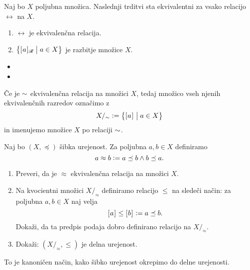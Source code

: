 		
		\begin{izrek}
			Naj bo $X$ poljubna množica. Naslednji trditvi sta ekvivalentni za vsako relacijo $\rel$ na $X$.
			\begin{enumerate}
				\item
					$\rel$ je ekvivalenčna relacija.
				\item
					$\set[1]{\ec[\rel]{a}}{a \in X}$ je razbitje množice $X$.
			\end{enumerate}
		\end{izrek}
		
		\begin{dokaz}
			\begin{itemize}
				\item{}
				\item{}
			\end{itemize}
		\end{dokaz}
		
		Če je $\sim$ ekvivalenčna relacija na množici $X$, tedaj množico vseh njenih ekvivalenčnih razredov označimo z
		\[X/_\equ \dfeq \set[1]{\ec{a}}{a \in X}\]
		in imenujemo  množice $X$ po relaciji $\sim$.
		
		
		\begin{vaja}
			Naj bo $(X, \preceq)$ šibka urejenost. Za poljubna $a, b \in X$ definiramo
			\[a \approx b \mathrel{\mathop:}= a \preceq b \land b \preceq a.\]
			\begin{enumerate}
				\item
					Preveri, da je $\approx$ ekvivalenčna relacija na množici $X$.
				\item
					Na kvocientni množici $X/_\approx$ definiramo relacijo $\leq$ na sledeči način: za poljubna $a, b \in X$ naj velja
					\[[\:\!{a}\:\!]_{} \leq [\:\!{b}\:\!]_{} \mathrel{\mathop:}= a \preceq b.\]
					Dokaži, da ta predpis podaja dobro definirano relacijo na $X/_\approx$.
				\item
					Dokaži: $(X/_\approx, \leq)$ je delna urejenost.
			\end{enumerate}
			To je kanoničen način, kako šibko urejenost okrepimo do delne urejenosti.
		\end{vaja}
		

